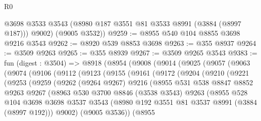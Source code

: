 \begin{lexlean}{R0}
\begin{coremodule}
        @3698
        @3533
        @3543
        (@8980 @187 @3551 @81 @3533 @8991 (@3884 (@8997 @187)))
        @9002)
      (@9005 @3532))
@9259 := @8955 @540 @104 @8855 @3698 @9216 @3543
@9262 := @8920 @539 @8853 @3698
@9263 := @355 @8937
@9264 := @3509 @9263
@9265 := @355 @8939
@9267 := @3509 @9265 @3543
@9383 := fun (digest : @3504) =>
  @8918
    (@8954
      (@9008
        (@9014
          (@9025
            (@9057
              (@9063
                (@9074
                  (@9106
                    (@9112
                      (@9123
                        (@9155
                          (@9161
                            (@9172
                              (@9204
                                (@9210
                                  (@9221
                                    (@9253
                                      (@9259
                                        (@9262
                                          (@9264 @9267)
                                          @9216
                                          (@8955
                                            @531
                                            @538
                                            @8847
                                            @8852
                                            @9263
                                            @9267
                                            (@8963
                                              @530
                                              @3700
                                              @8846
                                              (@3538 @3543)
                                              @9263
                                              (@8955
                                                @528
                                                @104
                                                @3698
                                                @3698
                                                @3537
                                                @3543
                                                (@8980
                                                  @192
                                                  @3551
                                                  @81
                                                  @3537
                                                  @8991
                                                  (@3884 (@8997 @192)))
                                                @9002)
                                              (@9005 @3536))
                                            (@8955

\end{coremodule}
\end{lexlean}
